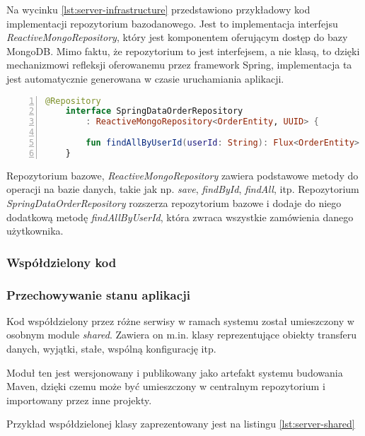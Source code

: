 Na wycinku \ref{lst:server-infrastructure} przedstawiono przykładowy kod implementacji repozytorium bazodanowego. Jest to implementacja interfejsu \textit{ReactiveMongoRepository}, który jest komponentem oferującym dostęp do bazy MongoDB. Mimo faktu, że repozytorium to jest interfejsem, a nie klasą, to dzięki mechanizmowi refleksji oferowanemu przez framework Spring, implementacja ta jest automatycznie generowana w czasie uruchamiania aplikacji.

\begin{lstlisting}[caption={Kod implementacji repozytorium bazodanowego},label={lst:server-infrastructure},captionpos=b,language=Kotlin,numbers=left,showstringspaces=false]
    @Repository
    interface SpringDataOrderRepository 
        : ReactiveMongoRepository<OrderEntity, UUID> {
    
        fun findAllByUserId(userId: String): Flux<OrderEntity>
    }
\end{lstlisting}

Repozytorium bazowe, \textit{ReactiveMongoRepository} zawiera podstawowe metody do operacji na bazie danych, takie jak np. \textit{save}, \textit{findById}, \textit{findAll}, itp. Repozytorium \textit{SpringDataOrderRepository} rozszerza repozytorium bazowe i dodaje do niego dodatkową metodę \textit{findAllByUserId}, która zwraca wszystkie zamówienia danego użytkownika.

\subsubsection{Współdzielony kod}\subsubsection{Przechowywanie stanu aplikacji}

Kod współdzielony przez różne serwisy w ramach systemu został umieszczony w osobnym module \textit{shared}. Zawiera on m.in. klasy reprezentujące obiekty transferu danych, wyjątki, stałe, wspólną konfigurację itp.

Moduł ten jest wersjonowany i publikowany jako artefakt systemu budowania Maven, dzięki czemu może być umieszczony w centralnym repozytorium i importowany przez inne projekty.

Przykład współdzielonej klasy zaprezentowany jest na listingu \ref{lst:server-shared}

